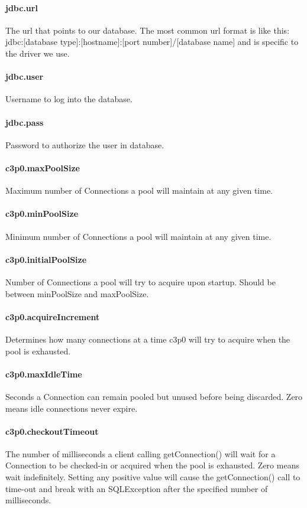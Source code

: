 \documentclass[12pt,a4paper]{report}
\begin{document}
\paragraph{jdbc.url}
 The url that points to our database. The most common url format is like this:
jdbc:[database type]:[hostname]:[port number]/[database name]
and is specific to the driver we use.

\paragraph{jdbc.user}
Username to log into the database.
\paragraph{jdbc.pass}
Password to authorize the user in database.

\paragraph{c3p0.maxPoolSize}
Maximum number of Connections a pool will maintain at any given time.

\paragraph{c3p0.minPoolSize}
Minimum number of Connections a pool will maintain at any given time.

\paragraph{c3p0.initialPoolSize}
Number of Connections a pool will try to acquire upon startup. Should be between minPoolSize and maxPoolSize.

\paragraph{c3p0.acquireIncrement}
Determines how many connections at a time c3p0 will try to acquire when the pool is exhausted.

\paragraph{c3p0.maxIdleTime}
Seconds a Connection can remain pooled but unused before being discarded. Zero means idle connections never expire.

\paragraph{c3p0.checkoutTimeout}
The number of milliseconds a client calling getConnection() will wait for a Connection to be checked-in or acquired when the pool is exhausted. Zero means wait indefinitely. Setting any positive value will cause the getConnection() call to time-out and break with an SQLException after the specified number of milliseconds.
\end{document}
